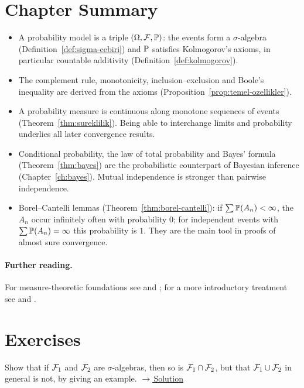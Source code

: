 \documentclass[main.tex]{subfiles}
\begin{document}
\section{Chapter Summary}
\begin{summary}
\begin{itemize}
  \item A probability model is a triple $(\Omega,\F,\P)$: the events form a $\sigma$-algebra (Definition~\ref{def:sigma-cebiri}) and $\P$ satisfies Kolmogorov's axioms, in particular countable additivity (Definition~\ref{def:kolmogorov}).
  \item The complement rule, monotonicity, inclusion--exclusion and Boole's inequality are derived from the axioms (Proposition~\ref{prop:temel-ozellikler}).
  \item A probability measure is continuous along monotone sequences of events (Theorem~\ref{thm:sureklilik}). Being able to interchange limits and probability underlies all later convergence results.
  \item Conditional probability, the law of total probability and Bayes' formula (Theorem~\ref{thm:bayes}) are the probabilistic counterpart of Bayesian inference (Chapter~\ref{ch:bayes}). Mutual independence is stronger than pairwise independence.
  \item Borel--Cantelli lemmas (Theorem~\ref{thm:borel-cantelli}): if $\sum\P(A_n)<\infty$, the $A_n$ occur infinitely often with probability $0$; for independent events with $\sum\P(A_n)=\infty$ this probability is $1$. They are the main tool in proofs of almost sure convergence.
\end{itemize}
\end{summary}

\paragraph{Further reading.} For measure-theoretic foundations see \cite[Chapter~1]{durrett} and \cite[Sections~1--4]{billingsley}; for a more introductory treatment see \cite[Chapter~1]{casella} and \cite[Chapter~1]{wasserman}.

\section{Exercises}

\begin{exercise}\label{exr:01-1}
Show that if $\F_1$ and $\F_2$ are $\sigma$-algebras, then so is $\F_1\cap\F_2$, but that $\F_1\cup\F_2$ in general is not, by giving an example.
\hfill\hyperref[coz:01-1]{\footnotesize$\rightarrow$\,Solution}
\end{exercise}
\end{document}
